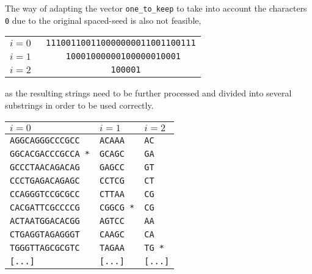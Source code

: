 \begin{example}
	The way of adapting the vector \verb|one_to_keep| to take into account the characters \texttt{0} due to the original spaced-seed is also not feasible, \begin{center}
		\begin{tabular}{l || l}
			$i = 0$ & \verb| 111001100110000000011001100111| \\
			$i = 1$ & \verb|     10001000000100000010001   | \\
			$i = 2$ & \verb|              100001           | \\
		\end{tabular}
	\end{center} as the resulting strings need to be further processed and divided into several substrings in order to be used correctly.
	
	\begin{center}
		\begin{tabular}{l | l | l}
			$i = 0$ & $i = 1$ & $i = 2$ \\
			\toprule
			\verb|AGGCAGGGCCCGCC| & \verb|ACAAA| & \verb|AC| \\
			\verb|GGCACGACCCGCCA *| & \verb|GCAGC| & \verb|GA| \\
			\verb|GCCCTAACAGACAG| & \verb|GAGCC| & \verb|GT| \\
			\verb|CCCTGAGACAGAGC| & \verb|CCTCG| & \verb|CT| \\
			\verb|CCAGGGTCCGCGCC| & \verb|CTTAA| & \verb|CG| \\
			\verb|CACGATTCGCCCCG| & \verb|CGGCG *| & \verb|CG| \\
			\verb|ACTAATGGACACGG| & \verb|AGTCC| & \verb|AA| \\
			\verb|CTGAGGTAGAGGGT| & \verb|CAAGC| & \verb|CA| \\
			\verb|TGGGTTAGCGCGTC| & \verb|TAGAA| & \verb|TG *| \\
			\verb|[...]| & \verb|[...]| & \verb|[...]| \\
		\end{tabular}
	\end{center}


\end{example}
